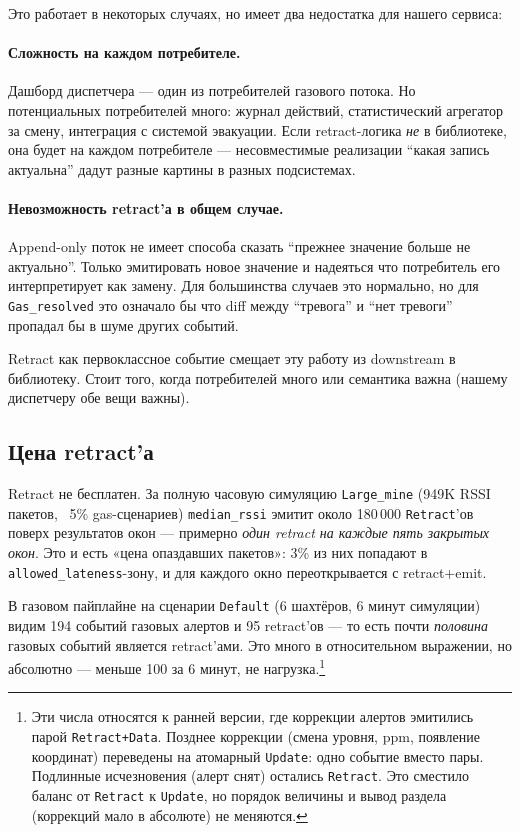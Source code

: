 Это работает в некоторых случаях, но имеет два недостатка для
нашего сервиса:

\paragraph{Сложность на каждом потребителе.} Дашборд диспетчера ---
один из потребителей газового потока. Но потенциальных потребителей
много: журнал действий, статистический агрегатор за смену,
интеграция с системой эвакуации. Если retract-логика
\emph{не} в библиотеке, она будет на каждом потребителе ---
несовместимые реализации ``какая запись актуальна'' дадут разные
картины в разных подсистемах.

\paragraph{Невозможность retract'а в общем случае.}
Append-only поток не имеет способа сказать ``прежнее значение
больше не актуально''. Только эмитировать новое значение и надеяться
что потребитель его интерпретирует как замену. Для большинства
случаев это нормально, но для \texttt{Gas\_resolved} это означало
бы что diff между ``тревога'' и ``нет тревоги'' пропадал бы в шуме
других событий.

Retract как первоклассное событие смещает эту работу из downstream в
библиотеку. Стоит того, когда потребителей много или семантика
важна (нашему диспетчеру обе вещи важны).

\subsection{Цена retract'а}

Retract не бесплатен. За полную часовую симуляцию
\texttt{Large\_mine} (949K RSSI пакетов, ~5\% gas-сценариев)
\texttt{median\_rssi} эмитит около 180\,000 \texttt{Retract}'ов
поверх результатов окон --- примерно \emph{один retract на каждые
пять закрытых окон}. Это и есть «цена опаздавших пакетов»: 3\% из
них попадают в \texttt{allowed\_lateness}-зону, и для каждого окно
переоткрывается с retract+emit.

В газовом пайплайне на сценарии \texttt{Default} (6 шахтёров,
6 минут симуляции) видим 194 событий газовых алертов и 95
retract'ов --- то есть почти \emph{половина} газовых событий
является retract'ами. Это много в относительном выражении, но
абсолютно --- меньше 100 за 6 минут, не нагрузка.\footnote{Эти числа
относятся к ранней версии, где коррекции алертов эмитились парой
\texttt{Retract+Data}. Позднее коррекции (смена уровня, ppm, появление
координат) переведены на атомарный \texttt{Update}: одно событие вместо
пары. Подлинные исчезновения (алерт снят) остались \texttt{Retract}.
Это сместило баланс от \texttt{Retract} к \texttt{Update}, но порядок
величины и вывод раздела (коррекций мало в абсолюте) не меняются.}

